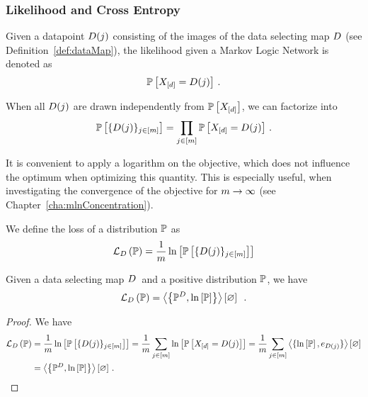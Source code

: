 \subsubsection{Likelihood and Cross Entropy}

Given a datapoint $D(j)$ consisting of the images of the data selecting map $D$ (see Definition~\ref{def:dataMap}), the likelihood given a Markov Logic Network is denoted as
	\[ \mathbb{P}\left[X_{[d]} = D(j)\right] \, . \]
	
When all $D(j)$ are drawn independently from $\mathbb{P}\left[X_{[d]}\right]$, we can factorize into
	\[ \mathbb{P}\left[\{D(j)\}_{j\in[m]}\right]  = \prod_{j\in[m]} \mathbb{P}\left[X_{[d]}=D(j)\right] \, . \]

It is convenient to apply a logarithm on the objective, which does not influence the optimum when optimizing this quantity.
This is especially useful, when investigating the convergence of the objective for $m\rightarrow\infty$ (see Chapter~\ref{cha:mlnConcentration}).

\begin{definition}
	We define the loss of a distribution $\mathbb{P}$ as
	\begin{align*}%
		\lossof{\probtensor} 
		= \frac{1}{\datanum} \lnof{\probof{\data}} 
	\end{align*}
\end{definition}



\begin{lemma}
	Given a data selecting map $D$ and a positive distribution $\mathbb{P}$, we have
	\begin{align}
		\lossof{\probtensor} = \sbcontraction{\empdistribution,\lnof{\probtensor}} \, . 
	\end{align}
\end{lemma}
\begin{proof}
	We have
	\begin{align*}
		\lossof{\probtensor} 
		& = \frac{1}{\datanum} \lnof{\probof{\data}} 
		= \frac{1}{\datanum} \sum_{\datain} \lnof{\probof{\shortcatvariables =\datamap(\dataindex)}} 
		= \frac{1}{\datanum} \sum_{\datain} \contraction{\{\lnof{\probtensor},\onehotmapof{\datamap(\dataindex)}\}} \\ 
		& = \sbcontraction{\empdistribution,\lnof{\probtensor}} \, .
	\end{align*}
\end{proof}


